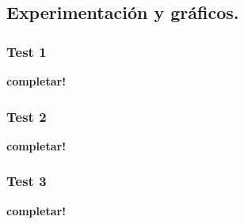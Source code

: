 \vspace*{0.6cm}

\subsection{Experimentación y gráficos.}

\vspace*{0.3cm}

\subsubsection{Test 1}

\vspace*{0.3cm}

\textbf{completar!}


\newpage
\subsubsection{Test 2}

\vspace*{0.3cm}

\textbf{completar!}


\newpage
\subsubsection{Test 3}

\vspace*{0.3cm}

\textbf{completar!}
